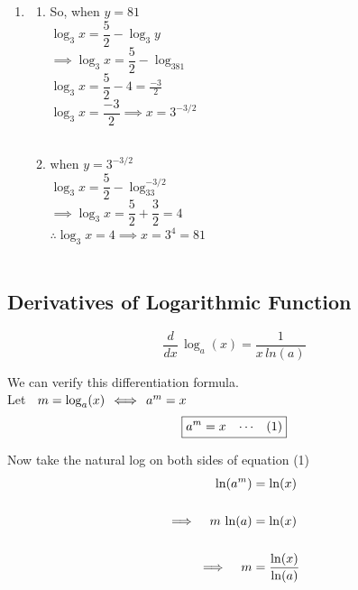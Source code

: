 \documentclass[11pt,a4paper]{article}
\begin{document}
\begin{enumerate}
\item[]
\begin{enumerate}
      \item[] So, when $y=81$\\
      
      $\log_3x=\dfrac{5}{2}-\log_3y$\\
      
      $\implies \log_3x=\dfrac{5}{2}-\log_381$\\
      
      $\log_3x = \dfrac{5}{2}-4=\frac{-3}{2}$\\
      
      $\log_3x=\dfrac{-3}{2}\implies x=3^{-3/2}$\\\\
      
      
      \item when $y=3^{-3/2}$\\
      
      $\log_3x=\dfrac{5}{2}-\log_33^{-3/2}$\\
      
      $\implies \log_3x=\dfrac{5}{2}+\dfrac{3}{2}=4$\\
      
      $\therefore \log_3x=4\implies x=3^4=81$\\\\
\end{enumerate}
\end{enumerate}





\pagebreak

\subsection{Derivatives of Logarithmic Function}

$$\boxed{\dfrac{d}{dx}\, \log_a (x)=\dfrac{1}{x\, ln (a)}}$$

We can verify this differentiation formula.\\

Let $\hspace{0.2cm}m=\log_a (x)\, \iff\, a^m = x$
$$\boxed{a^m = x\hspace{0.3cm}\cdots\hspace{0.3cm}(1)}$$

Now take the natural log on both sides of equation (1)
\begin{align*}
\ln (a^m) & = \ln (x)\\\\
\implies\hspace{0.3cm} m\, \ln (a) & = \ln (x)\\\\
\implies \hspace{0.3cm} m & = \dfrac{\ln (x)}{\ln (a)}
\end{align*}
\end{document}
